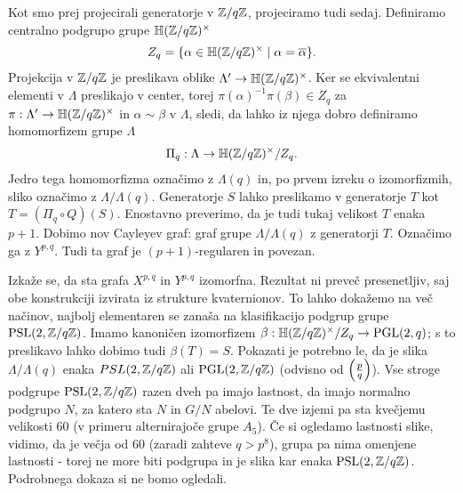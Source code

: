 Kot smo prej projecirali generatorje v \(\mathbb Z/q\mathbb Z\), projeciramo tudi sedaj. Definiramo centralno podgrupo grupe \(\mathbb H(\mathbb Z/q\mathbb Z)^\times\)
\begin{align*}
    Z_q = \{\alpha \in \mathbb H(\mathbb Z/q\mathbb Z)^\times \mid \alpha = \overline\alpha\}.
\end{align*}
Projekcija v \(\mathbb Z/q\mathbb Z\) je preslikava oblike \(\Lambda' \to\mathbb H(\mathbb Z/q\mathbb Z)^\times\). Ker se ekvivalentni elementi v \(\Lambda\) preslikajo v center, torej \(\pi(\alpha)^{-1}\pi(\beta)\in Z_q\) za \(\pi:\Lambda' \to\mathbb H(\mathbb Z/q\mathbb Z)^\times\) in \(\alpha\sim\beta\) v \(\Lambda\), sledi, da lahko iz njega dobro definiramo homomorfizem grupe \(\Lambda\)
\begin{align*}
    \Pi_q: \Lambda \to \mathbb H(\mathbb Z/q\mathbb Z)^\times/Z_q.
\end{align*}
Jedro tega homomorfizma označimo z \(\Lambda(q)\) in, po prvem izreku o izomorfizmih, sliko označimo z \(\Lambda/\Lambda(q)\). Generatorje \(S\) lahko preslikamo v generatorje \(T\) kot \(T=(\Pi_q \circ Q)(S)\). Enostavno preverimo, da je tudi tukaj velikost \(T\) enaka \(p+1\). Dobimo nov Cayleyev graf: graf grupe \(\Lambda/\Lambda(q)\) z generatorji \(T\). Označimo ga z \(Y^{p,q}\). Tudi ta graf je \((p+1)\)-regularen in povezan.

Izkaže se, da sta grafa \(X^{p,q}\) in \(Y^{p,q}\) izomorfna. Rezultat ni preveč presenetljiv, saj obe konstrukciji izvirata iz strukture kvaternionov. To lahko dokažemo na več načinov, najbolj elementaren se zanaša na klasifikacijo podgrup grupe \(\operatorname{PSL}(2, \mathbb Z/q\mathbb Z)\). Imamo kanoničen izomorfizem \(\beta:\mathbb H(\mathbb Z/q\mathbb Z)^\times /Z_q\to \operatorname{PGL}(2, q)\); s to preslikavo lahko dobimo tudi \(\beta(T)=S\). Pokazati je potrebno le, da je slika \(\Lambda/\Lambda(q)\) enaka \(PSL(2, \mathbb Z/q\mathbb Z)\) ali \(\operatorname{PGL}(2, \mathbb Z/q\mathbb Z)\) (odvisno od \(\left(\frac{p}{q}\right)\)). Vse stroge podgrupe \(\operatorname{PSL}(2, \mathbb Z/q\mathbb Z)\) razen dveh pa imajo lastnost, da imajo normalno podgrupo \(N\), za katero sta \(N\) in \(G/N\) abelovi. Te dve izjemi pa sta kvečjemu velikosti 60 (v primeru alternirajoče grupe \(A_5\)). Če si ogledamo lastnosti slike, vidimo, da je večja od \(60\) (zaradi zahteve \(q>p^8\)), grupa pa nima omenjene lastnosti - torej ne more biti podgrupa in je slika kar enaka \(\operatorname{PSL}(2, \mathbb Z/q\mathbb Z)\). Podrobnega dokaza si ne bomo ogledali.



